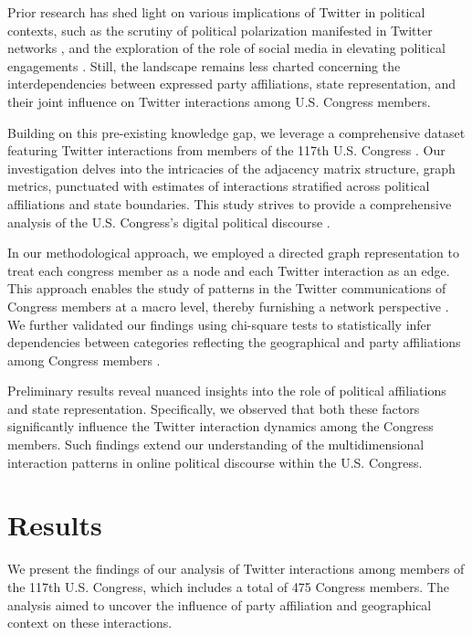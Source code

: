 \documentclass[11pt]{article}
\begin{document}
Prior research has shed light on various implications of Twitter in political contexts, such as the scrutiny of political polarization manifested in Twitter networks \cite{Yarchi2020PoliticalPO}, and the exploration of the role of social media in elevating political engagements \cite{Kahne2018ThePS, Stier2018ElectionCO}. Still, the landscape remains less charted concerning the interdependencies between expressed party affiliations, state representation, and their joint influence on Twitter interactions among U.S. Congress members.

Building on this pre-existing knowledge gap, we leverage a comprehensive dataset featuring Twitter interactions from members of the 117th U.S. Congress \cite{Hemphill2013FramingIS, Hua2020TowardsMA}. Our investigation delves into the intricacies of the adjacency matrix structure, graph metrics, punctuated with estimates of interactions stratified across political affiliations and state boundaries. This study strives to provide a comprehensive analysis of the U.S. Congress's digital political discourse \cite{Sun2018ATPDG, Hu2020OpenGB}.

In our methodological approach, we employed a directed graph representation to treat each congress member as a node and each Twitter interaction as an edge. This approach enables the study of patterns in the Twitter communications of Congress members at a macro level, thereby furnishing a network perspective \cite{Yan2014AsymptoticsID, Olejarczyk2017GraphbasedAO}. We further validated our findings using chi-square tests to statistically infer dependencies between categories reflecting the geographical and party affiliations among Congress members \cite{Dong2021EDITSMA}.

Preliminary results reveal nuanced insights into the role of political affiliations and state representation. Specifically, we observed that both these factors significantly influence the Twitter interaction dynamics among the Congress members. Such findings extend our understanding of the multidimensional interaction patterns in online political discourse within the U.S. Congress.

\section*{Results}

We present the findings of our analysis of Twitter interactions among members of the 117th U.S. Congress, which includes a total of 475 Congress members. The analysis aimed to uncover the influence of party affiliation and geographical context on these interactions. 
\end{document}
